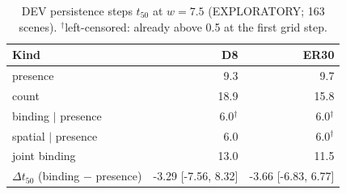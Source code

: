 \begin{table}[t]\centering\small
\caption{DEV persistence steps $t_{50}$ at $w=7.5$ (EXPLORATORY; 163 scenes). $^{\dagger}$left-censored: already above 0.5 at the first grid step.}\label{tab:dev-t50}
\begin{tabular}{lrr}
\toprule
Kind & D8 & ER30 \\
\midrule
presence & 9.3 & 9.7 \\
count & 18.9 & 15.8 \\
binding $\mid$ presence & 6.0$^{\dagger}$ & 6.0$^{\dagger}$ \\
spatial $\mid$ presence & 6.0 & 6.0$^{\dagger}$ \\
joint binding & 13.0 & 11.5 \\
$\Delta t_{50}$ (binding $-$ presence) & -3.29 [-7.56, 8.32] & -3.66 [-6.83, 6.77] \\
\bottomrule
\end{tabular}
\end{table}

